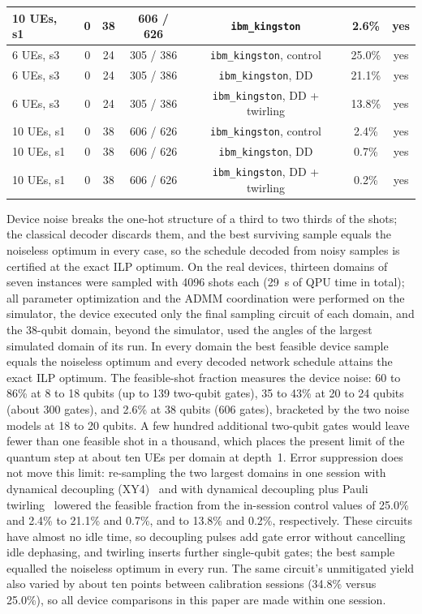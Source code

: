 \begin{table}[!t]
{\begin{tabular}{|l|c|c|c|c|c|c|}
10 UEs, s1 & 0 & 38 & 606 / 626 & \texttt{ibm\_kingston} & 2.6\% & yes \\
\hline
6 UEs, s3 & 0 & 24 & 305 / 386 & \texttt{ibm\_kingston}, control & 25.0\% & yes \\
6 UEs, s3 & 0 & 24 & 305 / 386 & \texttt{ibm\_kingston}, DD & 21.1\% & yes \\
6 UEs, s3 & 0 & 24 & 305 / 386 & \texttt{ibm\_kingston}, DD + twirling & 13.8\% & yes \\
10 UEs, s1 & 0 & 38 & 606 / 626 & \texttt{ibm\_kingston}, control & 2.4\% & yes \\
10 UEs, s1 & 0 & 38 & 606 / 626 & \texttt{ibm\_kingston}, DD & 0.7\% & yes \\
10 UEs, s1 & 0 & 38 & 606 / 626 & \texttt{ibm\_kingston}, DD + twirling & 0.2\% & yes \\
\hline
\end{tabular}%
}
\end{table}
Device noise breaks the one-hot structure of a third to two thirds of the shots; the classical decoder discards them,
and the best surviving sample equals the noiseless optimum in every case, so the schedule decoded from noisy samples is
certified at the exact ILP optimum. On the real devices, thirteen domains of seven instances were sampled with 4096
shots each (29~s of QPU time in total); all parameter optimization and the ADMM coordination were performed on the
simulator, the device executed only the final sampling circuit of each domain, and the 38-qubit domain, beyond the
simulator, used the angles of the largest simulated domain of its run. In every domain the best feasible device
sample equals the noiseless optimum and every decoded network schedule attains the exact ILP optimum. The
feasible-shot fraction measures the device noise: 60 to 86\% at 8 to 18 qubits (up to 139 two-qubit gates), 35 to
43\% at 20 to 24 qubits (about 300 gates), and 2.6\% at 38 qubits (606 gates), bracketed by the two noise models at
18 to 20 qubits. A few hundred additional two-qubit gates would leave fewer than one feasible shot in a thousand,
which places the present limit of the quantum step at about ten UEs per domain at depth~1. Error suppression
does not move this limit: re-sampling the two largest domains in one session with dynamical decoupling
(XY4)~\cite{Viola1999} and with dynamical decoupling plus Pauli twirling~\cite{Wallman2016} lowered the feasible
fraction from the in-session control values of 25.0\% and 2.4\% to 21.1\% and 0.7\%, and to 13.8\% and 0.2\%,
respectively. These circuits have almost no idle time, so decoupling pulses add gate error without cancelling idle
dephasing, and twirling inserts further single-qubit gates; the best sample equalled the noiseless optimum in every
run. The same circuit's unmitigated yield also varied by about ten points between calibration sessions (34.8\% versus
25.0\%), so all device comparisons in this paper are made within one session.

